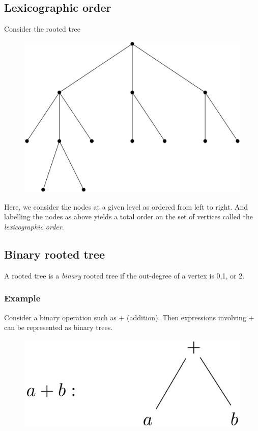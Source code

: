 \documentclass[11pt]{article}
\begin{document}
    \subsection{Lexicographic order}

    Consider the rooted tree
    \begin{figure}[H]
        \centering
        \includegraphics[scale=0.2]{lexi.png}
    \end{figure}
    Here, we consider the nodes at a given level as ordered from left to right. And labelling the nodes as above yields a total order on the set of vertices called the \emph{lexicographic order}.

    \subsection{Binary rooted tree}

    A rooted tree is a \emph{binary} rooted tree if the out-degree of a vertex is 0,1, or 2.

    \subsubsection{Example}

    Consider a binary operation such as \(+\) (addition). Then expressions involving \(+\) can be represented as binary trees. 
    \begin{figure}[H]
        \centering
        \includegraphics[scale=0.1]{ab.png}
    \end{figure}
\end{document}
